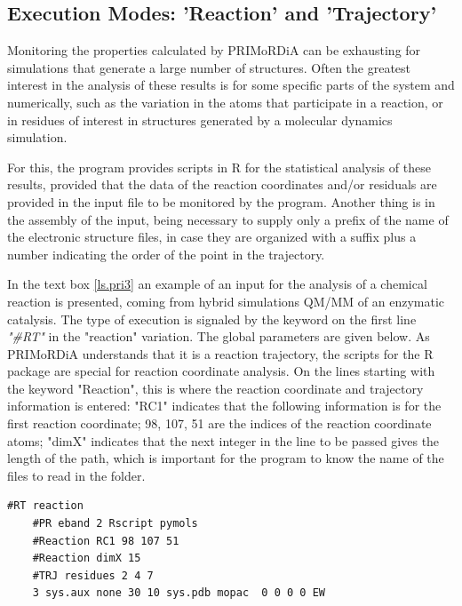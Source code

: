 \documentclass[a4paper,11pt]{refart}
\begin{document}
\subsection{Execution Modes: 'Reaction' and 'Trajectory'}

Monitoring the properties calculated by PRIMoRDiA can be exhausting for simulations that generate a large number of structures. Often the greatest interest in the analysis of these results is for some specific parts of the system and numerically, such as the variation in the atoms that participate in a reaction, or in residues of interest in structures generated by a molecular dynamics simulation.

For this, the program provides scripts in R for the statistical analysis of these results, provided that the data of the reaction coordinates and/or residuals are provided in the input file to be monitored by the program. Another thing is in the assembly of the input, being necessary to supply only a prefix of the name of the electronic structure files, in case they are organized with a suffix plus a number indicating the order of the point in the trajectory.

In the text box \autoref{ls.pri3} an example of an input for the analysis of a chemical reaction is presented, coming from hybrid simulations QM/MM of an enzymatic catalysis. The type of execution is signaled by the keyword on the first line \emph{"\#RT"} in the "reaction" variation. The global parameters are given below. As PRIMoRDiA understands that it is a reaction trajectory, the scripts for the R package are special for reaction coordinate analysis. On the lines starting with the keyword "Reaction", this is where the reaction coordinate and trajectory information is entered: "RC1" indicates that the following information is for the first reaction coordinate; 98, 107, 51 are the indices of the reaction coordinate atoms; "dimX" indicates that the next integer in the line to be passed gives the length of the path, which is important for the program to know the name of the files to read in the folder.

\hspace*{-\leftmarginwidth}
\begin{minipage}{\fullwidth}
	\begin{lstlisting}[caption=Exemplo de input para análise de coordenadas de reação.,label={ls.pri3}]
	#RT reaction 
	#PR eband 2 Rscript pymols
	#Reaction RC1 98 107 51
	#Reaction dimX 15
	#TRJ residues 2 4 7
	3 sys.aux none 30 10 sys.pdb mopac  0 0 0 0 EW
	\end{lstlisting}
\end{minipage}
\end{document}
